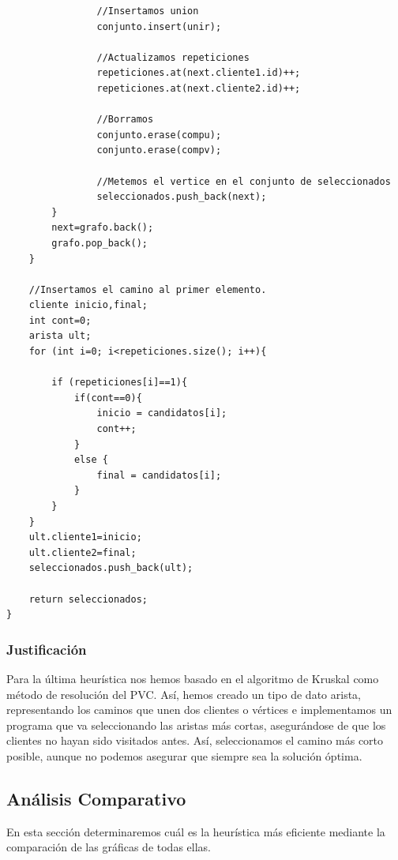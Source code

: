 \documentclass[a4paper,12pt,twoside]{article} %
\begin{document}
\begin{lstlisting}
                //Insertamos union
                conjunto.insert(unir);
    
                //Actualizamos repeticiones
                repeticiones.at(next.cliente1.id)++;
                repeticiones.at(next.cliente2.id)++;
    
                //Borramos
                conjunto.erase(compu);
                conjunto.erase(compv);
    
                //Metemos el vertice en el conjunto de seleccionados
                seleccionados.push_back(next);
        }
        next=grafo.back();
        grafo.pop_back();
    }

    //Insertamos el camino al primer elemento.
    cliente inicio,final;
    int cont=0;
    arista ult;
    for (int i=0; i<repeticiones.size(); i++){

        if (repeticiones[i]==1){
            if(cont==0){
                inicio = candidatos[i];
                cont++;
            }
            else {
                final = candidatos[i];
            }
        }
    }
    ult.cliente1=inicio;
    ult.cliente2=final;
    seleccionados.push_back(ult);

    return seleccionados;
}

\end{lstlisting}
\newpage

\subsubsection{Justificación}
Para la última heurística nos hemos basado en el algoritmo de Kruskal como método de resolución del PVC. Así, hemos creado un tipo de dato arista, representando los caminos que unen dos clientes o vértices e implementamos un programa que va seleccionando las aristas más cortas, asegurándose de que los clientes no hayan sido visitados antes. Así, seleccionamos el camino más corto posible, aunque no podemos asegurar que siempre sea la solución óptima.

\newpage

\subsection{Análisis Comparativo}

En esta sección determinaremos cuál es la heurística más eficiente mediante la comparación de las gráficas de todas ellas.
\end{document}
